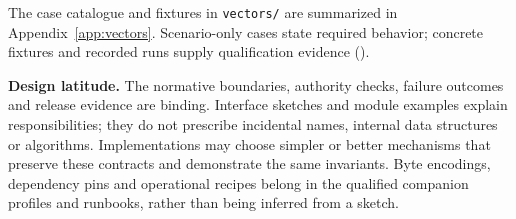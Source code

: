 The case catalogue and fixtures in \texttt{vectors/} are summarized in Appendix~\ref{app:vectors}. Scenario-only cases state required behavior; concrete fixtures and recorded runs supply qualification evidence ().

\textbf{Design latitude.} The normative boundaries, authority checks, failure outcomes and release evidence are binding. Interface sketches and module examples explain responsibilities; they do not prescribe incidental names, internal data structures or algorithms. Implementations may choose simpler or better mechanisms that preserve these contracts and demonstrate the same invariants. Byte encodings, dependency pins and operational recipes belong in the qualified companion profiles and runbooks, rather than being inferred from a sketch.
